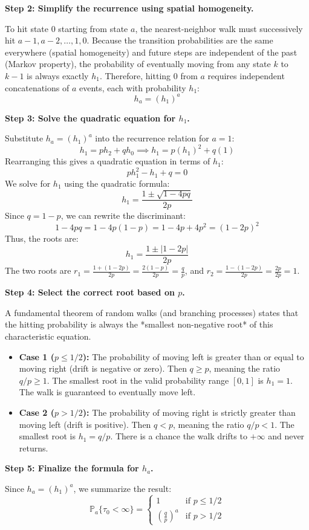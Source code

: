 \begin{solution}
\textbf{Step 2: Simplify the recurrence using spatial homogeneity.}

To hit state $0$ starting from state $a$, the nearest-neighbor walk must successively hit $a-1,a-2,\ldots,1,0$.
Because the transition probabilities are the same everywhere (spatial homogeneity) and future steps are independent of the past (Markov property), the probability of eventually moving from any state $k$ to $k-1$ is always exactly $h_1$.
Therefore, hitting $0$ from $a$ requires independent concatenations of $a$ events, each with probability $h_1$:
\[ h_a = (h_1)^a \]

\textbf{Step 3: Solve the quadratic equation for $h_1$.}

Substitute $h_a = (h_1)^a$ into the recurrence relation for $a=1$:
\[ h_1 = p h_2 + q h_0 \implies h_1 = p (h_1)^2 + q (1) \]
Rearranging this gives a quadratic equation in terms of $h_1$:
\[ p h_1^2 - h_1 + q = 0 \]
We solve for $h_1$ using the quadratic formula:
\[ h_1 = \frac{1 \pm \sqrt{1 - 4pq}}{2p} \]
Since $q = 1-p$, we can rewrite the discriminant:
\[ 1 - 4pq = 1 - 4p(1-p) = 1 - 4p + 4p^2 = (1-2p)^2 \]
Thus, the roots are:
\[ h_1 = \frac{1 \pm |1-2p|}{2p} \]
The two roots are $r_1 = \frac{1 + (1-2p)}{2p} = \frac{2(1-p)}{2p} = \frac{q}{p}$, and $r_2 = \frac{1 - (1-2p)}{2p} = \frac{2p}{2p} = 1$.

\textbf{Step 4: Select the correct root based on $p$.}

A fundamental theorem of random walks (and branching processes) states that the hitting probability is always the *smallest non-negative root* of this characteristic equation.
\begin{itemize}
    \item \textbf{Case 1 ($p \leq 1/2$):} The probability of moving left is greater than or equal to moving right (drift is negative or zero). Then $q \geq p$, meaning the ratio $q/p \geq 1$. The smallest root in the valid probability range $[0, 1]$ is $h_1 = 1$. The walk is guaranteed to eventually move left.
    \item \textbf{Case 2 ($p > 1/2$):} The probability of moving right is strictly greater than moving left (drift is positive). Then $q < p$, meaning the ratio $q/p < 1$. The smallest root is $h_1 = q/p$. There is a chance the walk drifts to $+\infty$ and never returns.
\end{itemize}

\textbf{Step 5: Finalize the formula for $h_a$.}

Since $h_a = (h_1)^a$, we summarize the result:
\[
\mathbb{P}_a\{\tau_0 < \infty\} = 
\begin{cases} 
1 & \text{if } p \leq 1/2 \\ 
\left(\frac{q}{p}\right)^a & \text{if } p > 1/2 
\end{cases}
\]
\end{solution}

